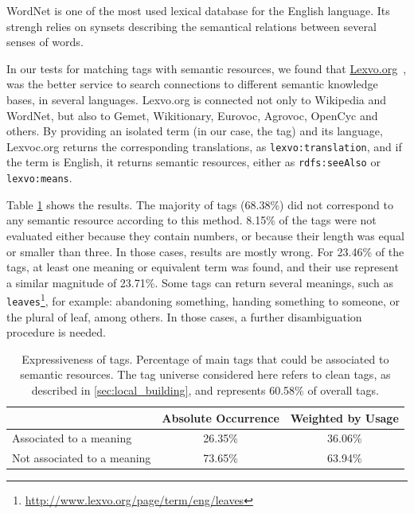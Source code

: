 WordNet \cite{Fellbaum1998} is one of the most used lexical database for the English language.
Its strengh relies on synsets describing the semantical relations between several senses of words.

In our tests for matching tags with semantic resources, we found that \url{Lexvo.org}~\cite{Melo2013}, was the better service to search connections to different semantic knowledge bases, in several languages.
Lexvo.org is connected not only to Wikipedia and WordNet, but also to Gemet, Wikitionary, Eurovoc, Agrovoc, OpenCyc and others.
By providing an isolated term (in our case, the tag) and its language, Lexvoc.org returns the corresponding translations, as \texttt{lexvo:translation}, and if the term is English, it returns semantic resources, either as \texttt{rdfs:seeAlso} or \texttt{lexvo:means}.

Table \ref{tab:expressiveness} shows the results. 
The majority of tags (68.38\%) did not correspond to any semantic resource according to this method.
8.15\% of the tags were not evaluated either because they contain numbers, or because their length was equal or smaller than three. 
In those cases, results are mostly wrong.
For 23.46\% of the tags, at least one meaning or equivalent term was found, and their use represent a similar magnitude of 23.71\%.
Some tags can return several meanings, such as \texttt{leaves}\footnote{\url{http://www.lexvo.org/page/term/eng/leaves}}, for example: abandoning something, handing something to someone, or the plural of leaf, among others. 
In those cases, a further disambiguation procedure is needed.

\begin{table}[]
\centering
\caption[Expressiveness of tags.]{Expressiveness of tags. Percentage of main tags that could be associated to semantic resources. The tag universe considered here refers to clean tags, as described in \autoref{sec:local_building}, and represents 60.58\% of overall tags.}
\label{tab:expressiveness}
\begin{tabular}{|l|c|c|}
\hline
                            & \textbf{Absolute Occurrence} & \textbf{Weighted by Usage} \\ \hline
Associated to a meaning     & 26.35\%           & 36.06\%                    \\ \hline
Not associated to a meaning & 73.65\%           & 63.94\%                    \\ \hline
\end{tabular}
\end{table}

